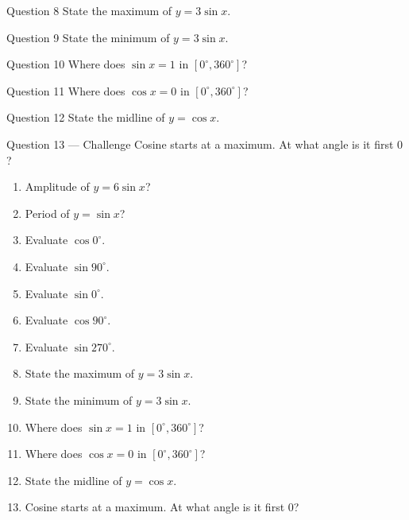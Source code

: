 \documentclass[11pt]{article}
\begin{document}
\begin{qbox}{Question 8}
State the maximum of $y=3\sin x$.\workspace{2.4cm}
\end{qbox}

\begin{qbox}{Question 9}
State the minimum of $y=3\sin x$.\workspace{2.4cm}
\end{qbox}

\begin{qbox}{Question 10}
Where does $\sin x=1$ in $[0^\circ,360^\circ]$?\workspace{2.4cm}
\end{qbox}

\begin{qbox}{Question 11}
Where does $\cos x=0$ in $[0^\circ,360^\circ]$?\workspace{2.4cm}
\end{qbox}

\begin{qbox}{Question 12}
State the midline of $y=\cos x$.\workspace{2.4cm}
\end{qbox}

\begin{qbox}{Question 13 --- Challenge}
Cosine starts at a maximum. At what angle is it first $0$?\workspace{2.6cm}
\end{qbox}

\clearpage
{}

\begin{recapbox}
\begin{multicols}{2}
\small
\begin{enumerate}[leftmargin=*,itemsep=3pt]
  \item Amplitude of $y=6\sin x$?
  \item Period of $y=\sin x$?
  \item Evaluate $\cos0^\circ$.
  \item Evaluate $\sin90^\circ$.
  \item Evaluate $\sin0^\circ$.
  \item Evaluate $\cos90^\circ$.
  \item Evaluate $\sin270^\circ$.
  \item State the maximum of $y=3\sin x$.
  \item State the minimum of $y=3\sin x$.
  \item Where does $\sin x=1$ in $[0^\circ,360^\circ]$?
  \item Where does $\cos x=0$ in $[0^\circ,360^\circ]$?
  \item State the midline of $y=\cos x$.
  \item Cosine starts at a maximum. At what angle is it first $0$?
\end{enumerate}
\end{multicols}
\end{recapbox}
\end{document}
